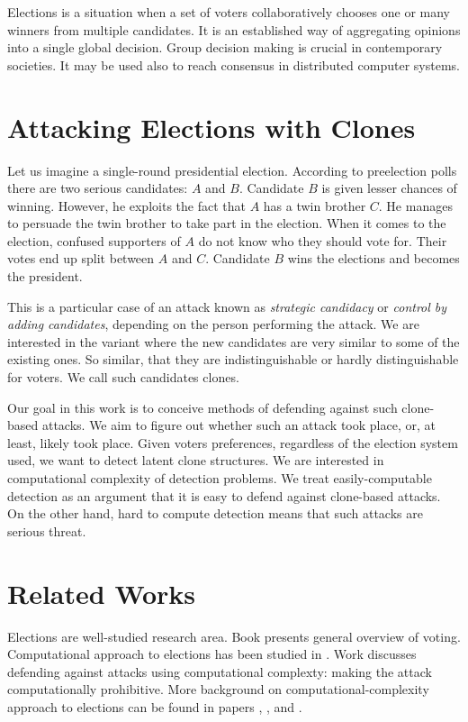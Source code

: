 Elections is a situation when a set of voters collaboratively chooses one or many winners from multiple candidates.
It is an established way of aggregating opinions into a single global decision.
Group decision making is crucial in contemporary societies.
It may be used also to reach consensus in distributed computer systems.

\section{Attacking Elections with Clones}

Let us imagine a single-round presidential election.
According to preelection polls there are two serious candidates: $A$ and $B$.
Candidate $B$ is given lesser chances of winning.
However, he exploits the fact that $A$ has a twin brother $C$.
He manages to persuade the twin brother to take part in the election.
When it comes to the election, confused supporters of $A$ do not know who they should vote for.
Their votes end up split between $A$ and $C$.
Candidate $B$ wins the elections and becomes the president.

This is a particular case of an attack known as \textit{strategic candidacy} or \textit{control by adding candidates}, %
depending on the person performing the attack.
We are interested in the variant where the new candidates are very similar to some of the existing ones.
So similar, that they are indistinguishable or hardly distinguishable for voters.
We call such candidates clones.

Our goal in this work is to conceive methods of defending against such clone-based attacks.
We aim to figure out whether such an attack took place, or, at least, likely took place.
Given voters preferences, regardless of the election system used, we want to detect latent clone structures.
We are interested in computational complexity of detection problems.
We treat easily-computable detection as an argument that it is easy to defend against clone-based attacks.
On the other hand, hard to compute detection means that such attacks are serious threat.

\section{Related Works}

Elections are well-studied research area.
Book \cite{handbook} presents general overview of voting.
Computational approach to elections has been studied in \cite{compsocialchoice}.
Work \cite{usingcomplexity} discusses defending against attacks using computational complexty:
making the attack computationally prohibitive.
More background on computational-complexity approach to elections
can be found in papers \cite{usingcomp1}, \cite{usingcomp2}, and \cite{usingcomp3}.

